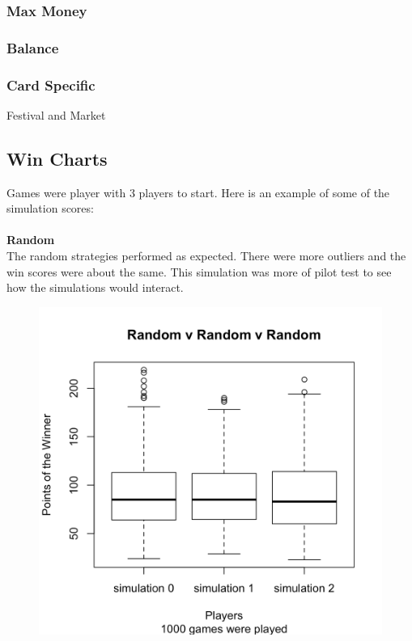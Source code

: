 \documentclass[11pt, oneside]{article}   	%
\begin{document}
\subsubsection{Max Money}

\subsubsection{Balance}

\subsubsection{Card Specific}

Festival and Market




\subsection{Win Charts}

Games were player with 3 players to start. Here is an example of some of the simulation scores: 
\\
\\
\textbf{Random} 
\\

The random strategies performed as expected. There were more outliers and the win scores were about the same. This simulation was more of pilot test to see how the simulations would interact. 

\begin{figure}[H]
\includegraphics[width=.75\textwidth]{random_random_random}
\centering
\end{figure}
\end{document}

